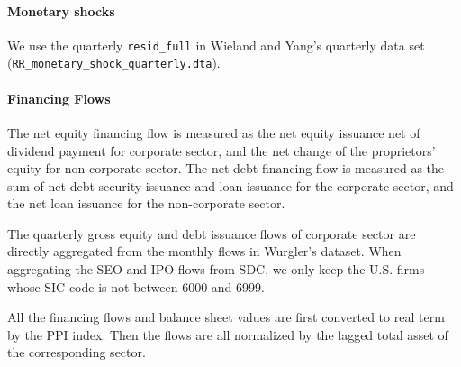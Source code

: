 \documentclass[11pt]{article}
\begin{document}
\paragraph{Monetary shocks} We use the quarterly \texttt{resid\_full} in Wieland and Yang's quarterly data set (\texttt{RR\_monetary\_shock\_quarterly.dta}). 
\paragraph{Financing Flows} The net equity financing flow is measured as the net equity issuance net of dividend payment for corporate sector, and the net change of the proprietors' equity for non-corporate sector. The net debt financing flow is measured as the sum of net debt security issuance and loan issuance for the corporate sector, and the net loan issuance for the non-corporate sector. 

The quarterly gross equity and debt issuance flows of corporate sector are directly aggregated from the monthly flows in Wurgler's dataset. When aggregating the SEO and IPO flows from SDC, we only keep the U.S. firms whose SIC code is not between 6000 and 6999.  

All the financing flows and balance sheet values are first converted to real term by the PPI index. Then the flows are all normalized by the lagged total asset of the corresponding sector.
\end{document}
